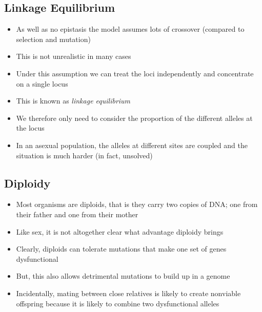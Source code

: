 
\begin{slide}
\section[-1]{Linkage Equilibrium}

\begin{PauseHighLight}
  \begin{itemize}\squeeze
  \item As well as no epistasis the model assumes lots of crossover
    (compared to selection and mutation)\pause
  \item This is not unrealistic in many cases\pause
  \item Under this assumption we can treat the loci independently and
    concentrate on a single locus\pause
  \item This is known as \emph{linkage equilibrium}\pause
  \item We therefore only need to consider the proportion of the
    different alleles at the locus\pause
  \item In an asexual population, the alleles at different sites are
    coupled and the situation is much harder (in fact, unsolved)\pause
  \end{itemize}
\end{PauseHighLight}

\end{slide}


\begin{slide}
\section{Diploidy}

\begin{PauseHighLight}
  \begin{itemize}
  \item Most organisms are diploids, that is they carry two copies of
    DNA; one from their father and one from their mother\pause
  \item Like sex, it is not altogether clear what advantage diploidy
    brings\pause
  \item Clearly, diploids can tolerate mutations that make one set of
    genes dysfunctional\pause
  \item But, this also allows detrimental mutations to build up in a
    genome\pause
  \item Incidentally, mating between close relatives is likely to create
    nonviable offspring because it is likely to combine two dysfunctional
    alleles\pause
  \end{itemize}
\end{PauseHighLight}

\end{slide}


